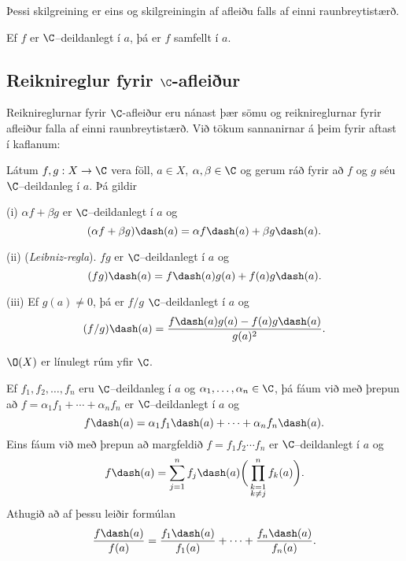 Þessi skilgreining er eins og skilgreiningin af afleiðu falls af einni
raun\-breyti\-stærð.  


\begin{se}\label{se:sammfelldni}  Ef $f$ er $\C$--deildanlegt í $a$, þá er $f$ samfellt í $a$.
\end{se}



\subsection*{Reiknireglur fyrir $\C$-afleiður}

Reiknireglurnar fyrir $\C$-afleiður eru nánast þær sömu og
reiknireglurnar fyrir afleiður falla af einni raunbreytistærð.
Við tökum sannanirnar á þeim fyrir aftast í kaflanum:


\begin{se}\label{set4.2.3}
Látum $f,g:X\to \C$ vera föll, $a\in X$, $\alpha,\beta\in \C$ og
gerum ráð fyrir að $f$ og $g$ séu $\C$--deildanleg í $a$.  
Þá gildir

\smallskip\noindent
(i) $\alpha f+\beta g$ er $\C$--deildanlegt í $a$ og 
 $$
(\alpha f+\beta g)\dash(a)=\alpha f\dash(a)+\beta g\dash(a).
 $$

\smallskip\noindent
(ii) ({\it Leibniz-regla}). $fg$ er $\C$--deildanlegt í $a$ og
$$
(fg)\dash(a)=f\dash(a)g(a)+f(a)g\dash(a).
$$

\smallskip\noindent
(iii) Ef $g(a)\neq 0$, þá er $f/g$ $\C$--deildanlegt í $a$ og 
$$(f/g)\dash(a)=\dfrac{f\dash(a)g(a)-f(a)g\dash(a)}{g(a)^2}.$$
\end{se}



\begin{fs}
$\O(X)$ er línulegt rúm yfir $\C$.
\end{fs}

Ef $f_1,f_2,\dots, f_n$ eru
$\C$--deildanleg í  $a$ og $\alpha_1,\dots,\alpha_n\in \C$, þá fáum við
með þrepun að
$f=\alpha_1f_1+\cdots+\alpha_nf_n$ er $\C$--deildanlegt í $a$ og
 $$f\dash(a)=\alpha_1 f_1\dash(a)+\cdots+\alpha_nf_n\dash(a).
 $$
Eins fáum við með þrepun að margfeldið $f=f_1f_2\cdots f_n$ er
$\C$--deildanlegt í $a$ og
 $$f\dash(a)= \sum_{j=1}^n f_j\dash(a)\bigg(\prod_{\substack{ k=1\\ k\neq
 j}}^n f_k(a)\bigg).
 $$
Athugið að af þessu leiðir formúlan
 $$\dfrac{f\dash(a)}{f(a)} =  \dfrac{f_1\dash(a)}{f_1(a)}+\cdots+
\dfrac{f_n\dash(a)}{f_n(a)}.
 $$


